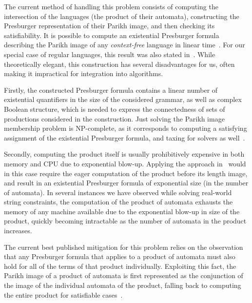   The current method of handling this problem consists of computing the
  intersection of the languages (the product of their automata),
  constructing the Presburger representation of their Parikh image, and then
  checking its satisfiability. It is possible to compute an existential
   Presburger formula describing the
  Parikh image of any \emph{context-free} language in linear
  time~\cite{generate-parikh-image}. For our special case of regular languages,
  this result was also stated in~\cite{muscholl-linear}. While theoretically
  elegant, this construction has several disadvantages for us, often making it
  impractical for integration into algorithms.
  
  Firstly, the constructed Presburger
  formula contains a linear number of existential quantifiers in the size of the
  considered grammar, as well as complex Boolean structure, which is needed to
  express the connectedness of sets of productions considered in the construction.%
  \iffalse{}Eliminating those quantifiers to obtain a quantifier-free representation of the
  Parikh image has exponential complexity~\cite{DBLP:conf/issac/Weispfenning97},
  and is often impossible in reasonable time.\fi{}%
  Just solving the Parikh image
  membership problem is NP-complete, as it corresponds to computing a satisfying
  assignment of the existential Presburger formula, and taxing for solvers as
  well~\cite{ostrich-plus}.
  
  Secondly, computing the product itself is usually prohibitively expensive
  in both memory and CPU due to exponential blow-up. Applying the approach in~\cite{generate-parikh-image} would in
  this case require the eager computation of the product before its length image,
  and result in an existential Presburger formula of exponential size (in the
  number of automata). In several instances we have observed while solving
  real-world string constraints, the computation of the product of automata
  exhausts the memory of any machine available due to the exponential blow-up in
  size of the product, quickly becoming intractable as the number of automata in
  the product increases.
  
  The current best published mitigation for this problem relies on the observation
  that any Presburger formula that applies to a product of automata must also hold
  for all of the terms of that product individually. Exploiting this fact, the Parikh
  image of a product of automata is first represented as the conjunction of the image of
  the individual automata of the product, falling back to computing the entire product
  for satisfiable cases~\cite{approximate-parikh}.


